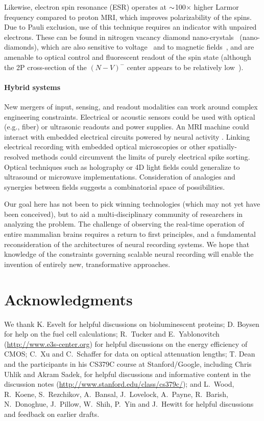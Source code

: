 Likewise, electron spin resonance (ESR) operates at ${\sim}$100$\times$ higher Larmor frequency compared to proton MRI, which improves polarizability of the spins.
Due to Pauli exclusion, use of this technique requires an indicator with unpaired electrons. These can be found in nitrogen vacancy diamond nano-crystals~\cite{horowitz12} (nano-diamonds), which are also sensitive to voltage~\cite{dolde11} and to magnetic fields~\cite{Hall2012}, and are amenable to optical control and fluorescent readout of the spin state (although the 2P cross-section of the $(N-V)^-$ center appears to be relatively low~\cite{Tse-Luen2007}).

\paragraph{Hybrid systems} New mergers of input, sensing, and readout modalities can work around complex engineering constraints. Electrical or acoustic sensors could be used with optical \cite{sadek2010wiring} (e.g., fiber) or ultrasonic readouts and power supplies. An MRI machine could interact with embedded electrical circuits powered by neural activity \cite{JasanoffInductorsGrant}. Linking electrical recording with embedded optical microscopies or other spatially-resolved methods could circumvent the limits of purely electrical spike sorting. Optical techniques such as holography or 4D light fields could generalize to ultrasound or microwave implementations. Consideration of analogies and synergies between fields suggests a combinatorial space of possibilities.

Our goal here has not been to pick winning technologies (which may not yet have been conceived), but to aid a multi-disciplinary community of researchers in analyzing the problem. 
The challenge of observing the real-time operation of entire mammalian brains requires a return to first principles, and a fundamental reconsideration of the architectures of neural recording systems.
We hope that knowledge of the constraints governing scalable neural recording will enable the invention of entirely new, transformative approaches.

\section{Acknowledgments}

We thank K. Esvelt for helpful discussions on bioluminescent proteins; D. Boysen for help on the fuel cell calculations; R.~Tucker and E.~Yablonovitch (\url{http://www.e3s-center.org}) for helpful discussions on the energy efficiency of CMOS; C.~Xu and C.~Schaffer for data on optical attenuation lengths; T. Dean and the participants in his CS379C course at Stanford/Google, including Chris Uhlik and Akram Sadek, for helpful discussions and informative content in the discussion notes (\url{http://www.stanford.edu/class/cs379c/}); and L.~Wood, R.~Koene, S.~Rezchikov, A.~Bansal, J.~Lovelock, A.~Payne, R.~Barish, N.~Donoghue, J.~Pillow, W.~Shih, P.~Yin and J.~Hewitt for helpful discussions and feedback on earlier drafts.

